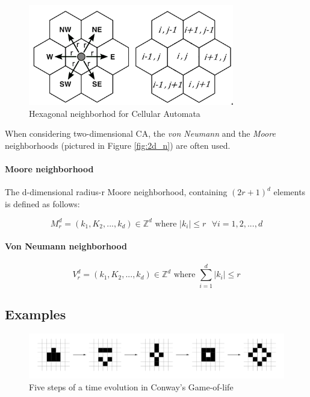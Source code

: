 \begin{figure}
  \centering
    \includegraphics[width=0.8\textwidth]{hex_n}%
    
  \caption{Hexagonal neighborhod for Cellular Automata\cite{hex_phy}}
  \label{fig:hex_n}
\end{figure}

When considering two-dimensional CA, the \textit{von Neumann} and the \textit{Moore} neighborhoods (pictured in Figure \ref{fig:2d_n}) are often used.

\paragraph{Moore neighborhood}

The d-dimensional radius-r Moore neighborhood, containing $(2r +1)^d$ elements is defined as follows:

$$M_r^d = (k_1, K_2,...,k_d) \in \mathds{Z}^d \text{ where } |k_i| \leq r \text{  } \forall i = 1,2,...,d $$ 

\paragraph{Von Neumann neighborhood}


$$V_r^d = (k_1, K_2,...,k_d) \in \mathds{Z}^d \text{ where } \sum_{i=1}^{d} |k_i| \leq r$$

\subsection{Examples}

\begin{figure}
  \centering
    \includegraphics[width=1\textwidth]{gameoflife_example}%
    
  \caption{Five steps of a time evolution in Conway's Game-of-life\cite{canotes}}
  \label{fig:gameoflife}
\end{figure}

